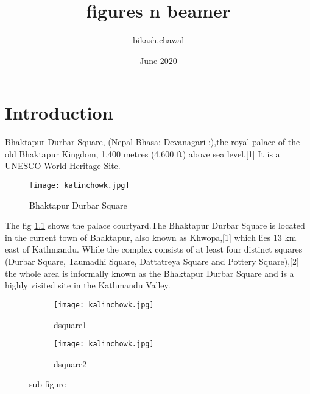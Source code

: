 \documentclass{report}
\title{figures n beamer}
\author{bikash.chawal }
\date{June 2020}
\begin{document}
\listoffigures
\maketitle

\chapter{Introduction}
Bhaktapur Durbar Square, (Nepal Bhasa: Devanagari :),the royal palace of the old Bhaktapur Kingdom, 1,400 metres (4,600 ft) above sea level.[1] It is a UNESCO World Heritage Site.
\begin{figure}[ht]
    \centering
    \texttt{[image: kalinchowk.jpg]}
    \caption{Bhaktapur Durbar Square}
    \label{dsquare}
\end{figure}
The fig \ref{dsquare} shows the palace courtyard.The Bhaktapur Durbar Square is located in the current town of Bhaktapur, also known as Khwopa,[1] which lies 13 km east of Kathmandu. While the complex consists of at least four distinct squares (Durbar Square, Taumadhi Square, Dattatreya Square and Pottery Square),[2] the whole area is informally known as the Bhaktapur Durbar Square and is a highly visited site in the Kathmandu Valley.
\begin{figure}
  \centering
    \begin{subfigure}[b]{0.8\textwidth}
       \centering
    \texttt{[image: kalinchowk.jpg]}
    \caption{dsquare1}
    \label{d1}
    \end{subfigure}
    \begin{subfigure}[b]{0.8\textwidth}
     \centering
    \texttt{[image: kalinchowk.jpg]}
    \caption{dsquare2}
    \label{d2}
    \end{subfigure}
    \caption{sub figure}
\end{figure}
\end{document}
